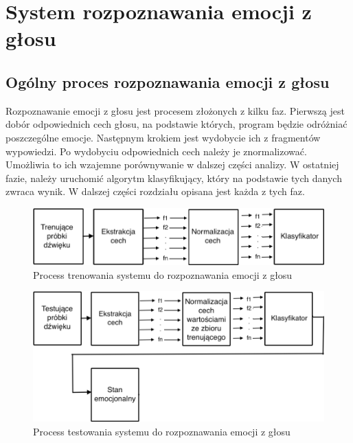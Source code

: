 \documentclass[declaration,shortabstract]{iithesis}
\begin{document}
\chapter{System rozpoznawania emocji z głosu}
\section{Ogólny proces rozpoznawania emocji z głosu}
Rozpoznawanie emocji z głosu jest procesem złożonych z kilku faz.
Pierwszą jest dobór odpowiednich cech głosu, na podstawie których, program będzie odróżniać poszczególne emocje. Następnym krokiem jest wydobycie ich z fragmentów wypowiedzi. Po wydobyciu odpowiednich cech należy je znormalizować. Umożliwia to ich wzajemne porównywanie w dalszej części analizy. W ostatniej fazie, należy uruchomić algorytm klasyfikujący, który na podstawie tych danych zwraca wynik.
W dalszej części rozdziału opisana jest każda z tych faz.

\begin{figure}[!ht]
\hspace*{-6cm}  
	\caption{Process trenowania systemu do rozpoznawania emocji z głosu}
	\includegraphics[scale=0.4]{trenowanie.png}
\end{figure}

\cleardoublepage

\begin{figure}[!ht]
\hspace*{-6cm}  
	\caption{Process testowania systemu do rozpoznawania emocji z głosu}
	\includegraphics[scale=0.35]{testowanie.png}
\end{figure}
\end{document}
